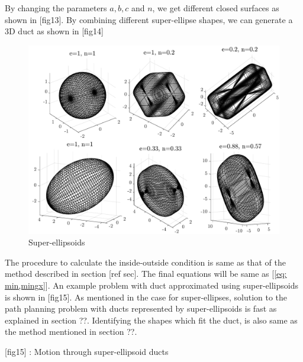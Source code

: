 \documentclass[12pt,a4]{article}
\begin{document}
By changing the parameters $a,b,c$ and $n$, we get different closed surfaces as shown in [fig13]. By combining different super-ellipse shapes, we can generate a 3D duct as shown in [fig14]

\begin{figure}[h!]
\centering
\includegraphics[scale=0.5]{figures/fig13.pdf}
\caption{ Super-ellipsoids \label{fig:SEs}}
\end{figure}

The procedure to calculate the inside-outside condition is same as that of the method described in section [ref sec]. The final equations will be same as [\ref{eq: min,mingx}]. An example problem with duct approximated using super-ellipsoids is shown in [fig15]. As mentioned in the case for super-ellipses, solution to the path planning problem with ducts represented by super-ellipsoids is fast as explained in section ??. Identifying the shapes which fit the duct, is also same as the method mentioned in section ??.

[fig15] : Motion through super-ellipsoid ducts
\end{document}
